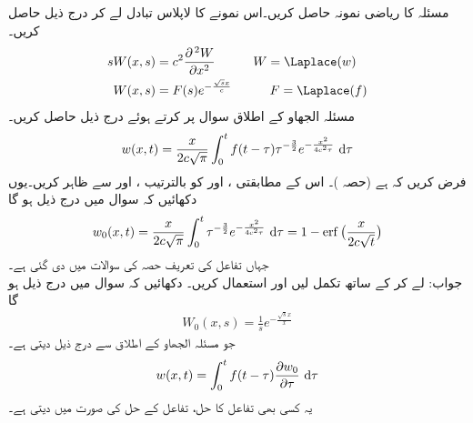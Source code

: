 \quad
مسئلہ کا ریاضی نمونہ حاصل کریں۔اس نمونے کا لاپلاس تبادل لے کر درج ذیل حاصل کریں۔
\begin{align*}
sW(x,s)&=c^2\frac{\partial^{\,2}W}{\partial x^2}\quad \quad \quad W=\Laplace(w)\\
W(x,s)&=F(s)e^{-\frac{\sqrt{s}x}{c}}\quad \quad \quad F=\Laplace(f)
\end{align*} 
\quad
مسئلہ الجھاو کے اطلاق سوال  پر کرتے ہوئے درج ذیل حاصل کریں۔
\begin{align*}
w(x,t)=\frac{x}{2c\sqrt{\pi}}\int_0^t f(t-\tau) \tau^{-\frac{3}{2}} e^{-\frac{x^2}{4c^2\tau}}\,\dif \tau
\end{align*}
\quad
فرض کریں کہ  ہے (حصہ )۔ اس کے مطابقتی ،  اور  کو بالترتیب ،  اور  سے ظاہر کریں۔یوں دکھائیں کہ سوال  میں درج ذیل ہو گا
\begin{align*}
w_0(x,t)=\frac{x}{2c\sqrt{\pi}}\int_0^t \tau^{-\frac{3}{2}}e^{-\frac{x^2}{4c^2\tau}}\,\dif \tau=1-\erf\big(\frac{x}{2c\sqrt{t}}\big)
\end{align*}
جہاں تفاعل  کی تعریف حصہ  کی سوالات میں دی گئی ہے۔\\
جواب:\quad
{} لے کر  کے ساتھ تکمل لیں اور  استعمال کریں۔
\quad
دکھائیں کہ سوال  میں درج ذیل ہو گا
\begin{align*}
W_0(x,s)=\frac{1}{s}e^{-\frac{\sqrt{s}x}{x}}
\end{align*}
جو مسئلہ الجھاو کے اطلاق سے درج ذیل دیتی ہے۔
\begin{align*}
w(x,t)=\int_0^t f(t-\tau)\frac{\partial w_0}{\partial \tau}\,\dif \tau
\end{align*}
یہ کسی بھی تفاعل   کا حل، تفاعل  کے حل  کی صورت میں دیتی ہے۔
